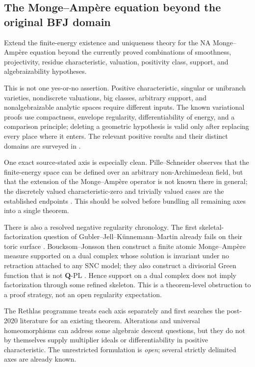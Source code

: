 \subsection{The Monge--Ampère equation beyond the original BFJ domain}

\begin{problem}\label{prob:frontier-general-ma}
Extend the finite-energy existence and uniqueness theory for the NA
Monge--Ampère equation beyond the currently proved combinations of smoothness,
projectivity, residue characteristic, valuation, positivity class, support,
and algebraizability hypotheses.
\end{problem}

This is not one yes-or-no assertion.  Positive characteristic, singular or
unibranch varieties, nondiscrete valuations, big classes, arbitrary support,
and nonalgebraizable analytic spaces require different inputs.  The known
variational proofs use compactness, envelope regularity, differentiability of
energy, and a comparison principle; deleting a geometric hypothesis is valid
only after replacing every place where it enters.  The relevant positive
results and their distinct domains are surveyed in
.

One exact source-stated axis is especially clean.  Pille--Schneider observes
that the finite-energy space can be defined over an arbitrary
non-Archimedean field, but that the extension of the Monge--Amp\`ere operator
is not known there in general; the discretely valued characteristic-zero and
trivially valued cases are the established endpoints
\cite[Remark~4.4]{PS23Hybrid}.  This should be solved before bundling all
remaining axes into a single theorem.

There is also a resolved negative regularity chronology.  The first
skeletal-factorization question of Gubler--Jell--K\"unnemann--Martin already
fails on their toric surface \cite[Appendix~A]{GJKM19}.
Boucksom--Jonsson then construct a finite
atomic Monge--Amp\`ere measure supported on a dual complex whose solution is
invariant under no retraction attached to any SNC model; they also construct
a divisorial Green function that is not \(\mathbf Q\)-PL
\cite[Theorems~A and~B]{BJGreen24}.  Hence support on a dual complex does not
imply factorization through some refined skeleton.  This is a theorem-level
obstruction to a proof strategy, not an open regularity expectation.

The Rethlas programme treats each axis separately and first searches the
post-2020 literature for an existing theorem.  Alterations and universal
homeomorphisms can address some algebraic descent questions, but they do not
by themselves supply multiplier ideals or differentiability in positive
characteristic.  The unrestricted formulation is \emph{open}; several
strictly delimited axes are already known.

